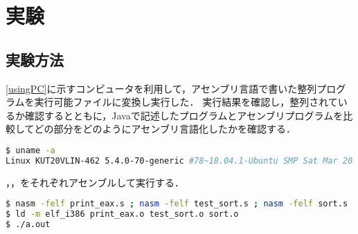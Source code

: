 \section{実験}
\subsection{実験方法}
\ref{usingPC}に示すコンピュータを利用して，アセンブリ言語で書いた整列プログラムを実行可能ファイルに変換し実行した．
実行結果を確認し，整列されているか確認するとともに，{\ttfamily Java}で記述したプログラムとアセンブリプログラムを比較してどの部分をどのようにアセンブリ言語化したかを確認する．
\begin{lstlisting}[frame={single},numbers={none},breakindent={0pt},language={Bash},caption={使用したコンピュータ},label={usingPC}]
$ uname -a
Linux KUT20VLIN-462 5.4.0-70-generic #78~18.04.1-Ubuntu SMP Sat Mar 20 14:10:07 UTC 2021 x86_64 x86_64 x86_64 GNU/Linux
\end{lstlisting}
，\testsort，をそれぞれアセンブルして実行する．
\begin{lstlisting}[frame={single},numbers={none},breakindent={0pt},language={Bash},caption={実行したコマンド}]
$ nasm -felf print_eax.s ; nasm -felf test_sort.s ; nasm -felf sort.s
$ ld -m elf_i386 print_eax.o test_sort.o sort.o
$ ./a.out
\end{lstlisting}

